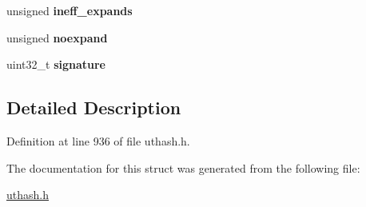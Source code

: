 \begin{DoxyCompactItemize}
\item 
\hypertarget{struct_u_t__hash__table_a216c7d98cf40a0064bee94aa8a5bf1b7}{
unsigned {\bfseries ineff\_\-expands}}
\label{struct_u_t__hash__table_a216c7d98cf40a0064bee94aa8a5bf1b7}

\item 
\hypertarget{struct_u_t__hash__table_a635661789933752e7b83dac84430eae1}{
unsigned {\bfseries noexpand}}
\label{struct_u_t__hash__table_a635661789933752e7b83dac84430eae1}

\item 
\hypertarget{struct_u_t__hash__table_a87d1ab3f3ede1809c6a485972d20b25f}{
uint32\_\-t {\bfseries signature}}
\label{struct_u_t__hash__table_a87d1ab3f3ede1809c6a485972d20b25f}

\end{DoxyCompactItemize}


\subsection{Detailed Description}


Definition at line 936 of file uthash.h.



The documentation for this struct was generated from the following file:\begin{DoxyCompactItemize}
\item 
\hyperlink{uthash_8h}{uthash.h}\end{DoxyCompactItemize}
